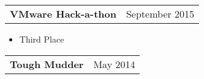 \documentclass{book}
\newenvironment{myitemize}
{ \begin{itemize}
	\setlength{\itemsep}{0pt}
	\setlength{\parskip}{0pt}
	\setlength{\parsep}{0pt}     }
{ \end{itemize}                  }
\begin{document}
\begin{tabular}{L{4.75in}R{1.75in}}

	{\large {\bfseries VMware Hack-a-thon}} & September 2015 \\

\end{tabular}

	\vspace{-\topsep}
	\begin{myitemize}
		\item Third Place 
	\end{myitemize} 


\begin{tabular}{L{4.75in}R{1.75in}}
	
	{\large {\bfseries Tough Mudder}} & May 2014 \\

\end{tabular}
\end{document}

